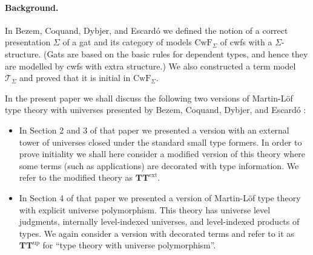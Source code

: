 \documentclass[11pt,a4paper]{article}
\theoremstyle{plain}
\theoremstyle{definition}
\newcommand{\T}{\mathsf{T}}
\def\T{\mathcal{T}}
\def\CwF{\mathrm{CwF}}
\def\Sigmaext{{\Sigma^\mathrm{ext}}}
\def\Sigmaint{{\Sigma^\mathrm{up}}}
\def\TText{{\mathbf{TT}^\mathrm{ext}}}
\def\TTint{{\mathbf{TT}^\mathrm{up}}}
\begin{document}
\paragraph{Background.}
%

In Bezem, Coquand, Dybjer, and Escard\'o \cite{bezem:hofmann} we defined the notion of a correct presentation $\Sigma$ of a gat and its category of models $\CwF_\Sigma$ of cwfs with a $\Sigma$-structure. (Gats are based on the basic rules for dependent types, and hence they are modelled by cwfs with extra structure.) We also constructed a term model $\T_\Sigma$ and proved that it is initial in $\CwF_\Sigma$.

In the present paper we shall discuss the following two versions of Martin-Löf type theory with universes presented by Bezem, Coquand, Dybjer, and Escard\'o \cite{BezemCDE22}:
\begin{itemize}
\item In Section 2 and 3 of that paper we presented a version with an external tower of universes closed under the standard small type formers. In order to prove initiality we shall here consider a modified version of this theory where some terms (such as applications) are decorated with type information. We refer to the modified theory as $\TText$.
\item In Section 4 of that paper we presented a version of Martin-Löf type theory with explicit universe polymorphism. This theory has universe level judgments, internally level-indexed universes, and level-indexed products of types. We again consider a version with decorated terms and refer to it as $\TTint$ for ``type theory with universe polymorphism''.
\end{itemize}
\end{document}
